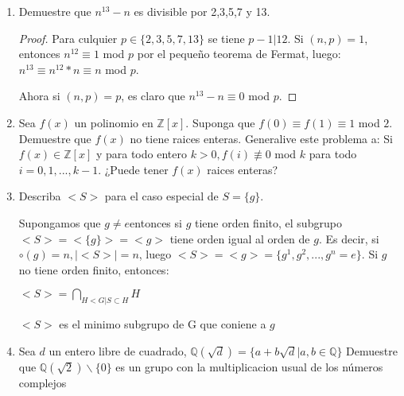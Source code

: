 \documentclass{article}
\theoremstyle{break}
\begin{document}
\begin{enumerate}
\begin{proof}
			\end{proof}
			
			
		\item Demuestre que $n^{13}-n$ es divisible por 2,3,5,7 y 13.
		
			\begin{proof}
			Para culquier $p \in \{2,3,5,7,13\}$ se tiene $p-1|12$.
			Si 		$(n,p)=1$, entonces $n^{12}\equiv 1$ mod $p$ por el pequeño teorema de Fermat, luego: $n^13\equiv n^12\ast n\equiv n$ mod $p$.
			
			Ahora si $(n,p)=p$, es claro que $n^{13}-n\equiv 0$ mod $p$.
			\end{proof}
			
			
		\item Sea $f(x)$ un polinomio en $\mathbb{Z}[x]$. Suponga que $f(0) \equiv f(1) \equiv 1$ mod $2$. Demuestre que $f(x)$ no tiene raices enteras. Generalive este problema a: Si $f(x) \in \mathbb{Z}[x]$ y para todo entero $k>0, f(i) \not\equiv 0$ mod $k$ para todo $i=0,1,...,k-1$. ¿Puede tener $f(x)$ raices enteras?
		
		\item Describa $<S>$ para el caso especial de $S=\{g\}$.
		
		Supongamos que $g\not=e$entonces si $g$ tiene orden finito, el subgrupo $<S>=<\{g\}>=<g>$ tiene orden igual al orden de $g$. Es decir, si $\circ (g)=n, |<S>|=n$, luego $<S>=<g>=\{g^1,g^2,...,g^n=e\}$. Si $g$ no tiene orden finito, entonces:
		
		\begin{center}
		$<S>=\displaystyle\bigcap_{H<G|S\subset H}{H}$
		\end{center}
		$<S>$ es el minimo subgrupo de G que coniene a $g$
		
		\item Sea $d$ un entero libre de cuadrado, $\mathbb{Q}(\sqrt{d})=\{a+b\sqrt{d} | a,b\in\mathbb{Q}\}$ Demuestre que $\mathbb{Q}(\sqrt{2})\backslash \{0\}$ es un grupo con la multiplicacion usual de los n\'umeros complejos
			

\end{enumerate}
\end{document}
